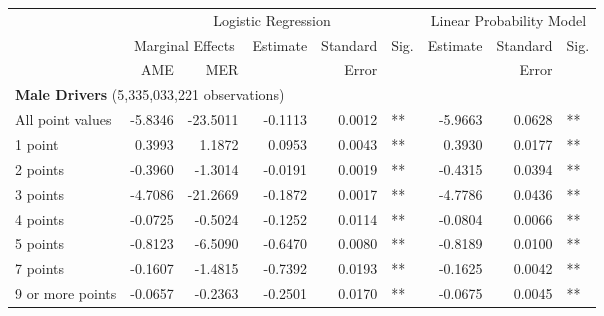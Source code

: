 \documentclass{cje}
\begin{document}
\begin{table}%
\centering 
\begin{tabular}{l r r r r l r r l} 

\hline 
 
 & \multicolumn{5}{c}{Logistic Regression}  & \multicolumn{3}{c}{Linear Probability Model} \\ 

 \cmidrule(lr){2-6}\cmidrule(lr){7-9} 
 & \multicolumn{2}{c}{Marginal Effects} & Estimate & Standard & Sig. & Estimate & Standard & Sig. \\ 

 \cmidrule(lr){2-3} 
 &   AME & MER &          &  Error   &      &          &  Error   &     \\ 

\hline 
 
\multicolumn{8}{l}{\textbf{Male Drivers} (5,335,033,221 observations)} \\ 

All point values                &  -5.8346        &  -23.5011       &  -0.1113        &  0.0012       &   **       &  -5.9663        &  0.0628       &   **       \\ 
1 point                         &  0.3993        &  1.1872       &  0.0953        &  0.0043       &   **       &  0.3930        &  0.0177       &   **       \\ 
2 points                        &  -0.3960        &  -1.3014       &  -0.0191        &  0.0019       &   **       &  -0.4315        &  0.0394       &   **       \\ 
3 points                        &  -4.7086        &  -21.2669       &  -0.1872        &  0.0017       &   **       &  -4.7786        &  0.0436       &   **       \\ 
4 points                        &  -0.0725        &  -0.5024       &  -0.1252        &  0.0114       &   **       &  -0.0804        &  0.0066       &   **       \\ 
5 points                        &  -0.8123        &  -6.5090       &  -0.6470        &  0.0080       &   **       &  -0.8189        &  0.0100       &   **       \\ 
7 points                        &  -0.1607        &  -1.4815       &  -0.7392        &  0.0193       &   **       &  -0.1625        &  0.0042       &   **       \\ 
9 or more points                &  -0.0657        &  -0.2363       &  -0.2501        &  0.0170       &   **       &  -0.0675        &  0.0045       &   **       \\ 


\end{tabular}
\end{table}
\end{document}
